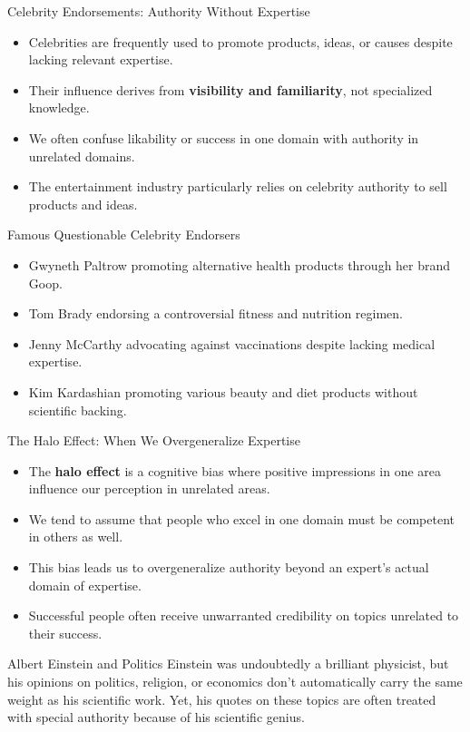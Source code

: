 \documentclass{beamer}
\begin{document}
\begin{frame}{Celebrity Endorsements: Authority Without Expertise}
    \begin{itemize}
        \item Celebrities are frequently used to promote products, ideas, or causes despite lacking relevant expertise.
        \item Their influence derives from \textbf{visibility and familiarity}, not specialized knowledge.
        \item We often confuse likability or success in one domain with authority in unrelated domains.
        \item The entertainment industry particularly relies on celebrity authority to sell products and ideas.
    \end{itemize}
    
    \begin{example}{Famous Questionable Celebrity Endorsers}
        \scriptsize
        \begin{itemize}
            \item Gwyneth Paltrow promoting alternative health products through her brand Goop.
            \item Tom Brady endorsing a controversial fitness and nutrition regimen.
            \item Jenny McCarthy advocating against vaccinations despite lacking medical expertise.
            \item Kim Kardashian promoting various beauty and diet products without scientific backing.
        \end{itemize}
    \end{example}
\end{frame}

\begin{frame}{The Halo Effect: When We Overgeneralize Expertise}
    \begin{itemize}
        \item The \textbf{halo effect} is a cognitive bias where positive impressions in one area influence our perception in unrelated areas.
        \item We tend to assume that people who excel in one domain must be competent in others as well.
        \item This bias leads us to overgeneralize authority beyond an expert's actual domain of expertise.
        \item Successful people often receive unwarranted credibility on topics unrelated to their success.
    \end{itemize}
    
    \begin{example}{Albert Einstein and Politics}
        Einstein was undoubtedly a brilliant physicist, but his opinions on politics, religion, or economics don't automatically carry the same weight as his scientific work. Yet, his quotes on these topics are often treated with special authority because of his scientific genius.
    \end{example}
\end{frame}
\end{document}
